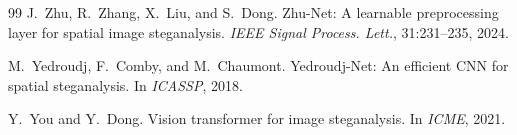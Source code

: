 \documentclass[10pt,a4paper]{article}
\begin{document}
\begin{thebibliography}{99}
J.~Zhu, R.~Zhang, X.~Liu, and S.~Dong.
\newblock Zhu-Net: A learnable preprocessing layer for spatial image
steganalysis.
\newblock \emph{IEEE Signal Process. Lett.}, 31:231--235, 2024.

M.~Yedroudj, F.~Comby, and M.~Chaumont.
\newblock Yedroudj-Net: An efficient CNN for spatial steganalysis.
\newblock In \emph{ICASSP}, 2018.

Y.~You and Y.~Dong.
\newblock Vision transformer for image steganalysis.
\newblock In \emph{ICME}, 2021.

\end{thebibliography}
\end{document}
